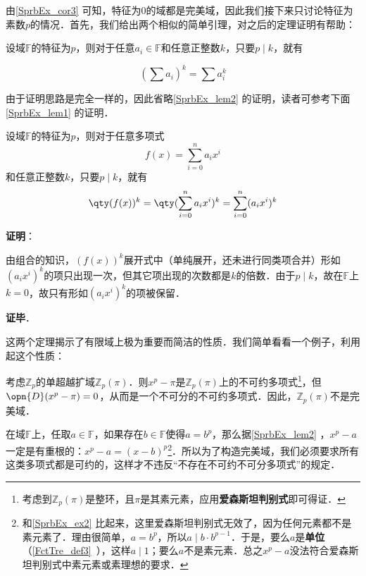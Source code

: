 由\autoref{SprbEx_cor3} 可知，特征为$0$的域都是完美域，因此我们接下来只讨论特征为素数$p$的情况．首先，我们给出两个相似的简单引理，对之后的定理证明有帮助：


\begin{lemma}{}\label{SprbEx_lem2}
设域$\mathbb{F}$的特征为$p$，则对于任意$a_i\in\mathbb{F}$和任意正整数$k$，只要$p\mid k$，就有

\begin{equation}
(\sum a_i)^k = \sum a_i^k
\end{equation}

\end{lemma}

由于证明思路是完全一样的，因此省略\autoref{SprbEx_lem2} 的证明，读者可参考下面\autoref{SprbEx_lem1} 的证明．


\begin{lemma}{}\label{SprbEx_lem1}
设域$\mathbb{F}$的特征为$p$，则对于任意多项式
\begin{equation}
f(x) = \sum_{i=0}^n a_ix^i
\end{equation}
和任意正整数$k$，只要$p\mid k$，就有
\begin{equation}
\qty(f(x))^k = \qty(\sum_{i=0}^n a_ix^i)^k = \sum_{i=0}^n (a_ix^i)^k
\end{equation}
\end{lemma}

\textbf{证明}：

由组合的知识，$(f(x))^k$展开式中（单纯展开，还未进行同类项合并）形如$(a_ix^i)^k$的项只出现一次，但其它项出现的次数都是$k$的倍数．由于$p\mid k$，故在$\mathbb{F}$上$k=0$，故只有形如$(a_ix^i)^k$的项被保留．

\textbf{证毕}．


这两个定理揭示了有限域上极为重要而简洁的性质．我们简单看看一个例子，利用起这个性质：




\begin{example}{}\label{SprbEx_ex2}
考虑$\mathbb{Z}_p$的单超越扩域$\mathbb{Z}_p(\pi)$．则$x^p-\pi$是$\mathbb{Z}_p(\pi)$上的不可约多项式\footnote{考虑到$\mathbb{Z}_p(\pi)$是整环，且$\pi$是其素元素，应用\textbf{爱森斯坦判别式}即可得证．}，但$\opn{D}(x^p-\pi)=0$，从而是一个不可分的不可约多项式．因此，$\mathbb{Z}_p(\pi)$不是完美域．

\end{example}



在域$\mathbb{F}$上，任取$a\in\mathbb{F}$，如果存在$b\in\mathbb{F}$使得$a=b^p$，那么据\autoref{SprbEx_lem2} ，$x^p-a$一定是有重根的：$x^p-a=(x-b)^p$\footnote{和\autoref{SprbEx_ex2} 比起来，这里爱森斯坦判别式无效了，因为任何元素都不是素元素了．理由很简单，$a=b^p$，所以$a\mid b\cdot b^{p-1}$．于是，要么$a$是\textbf{单位}（\autoref{FctTre_def3}~），这样$a\mid 1$；要么$a$不是素元素．总之$x^p-a$没法符合爱森斯坦判别式中素元素或素理想的要求．}．所以为了构造完美域，我们必须要求所有这类多项式都是可约的，这样才不违反“不存在不可约不可分多项式”的规定．

